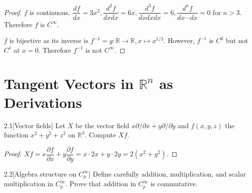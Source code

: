 \begin{proof}
    \( f \) is continuous, \( \dfrac{df}{dx} = 3x^{2}, \dfrac{d^{2}f}{dxdx} = 6x, \dfrac{d^{3}f}{dxdxdx} = 6, \dfrac{d^{n}f}{dx\cdots dx} = 0 \) for \( n > 3 \). Therefore \( f \) is \( C^{\infty} \).

    \( f \) is bijective as its inverse is \( f^{-1} = g: \mathbb{R} \to \mathbb{R}, x \mapsto x^{1/3} \). However, \( f^{-1} \) is \( C^{0} \) but not \( C^{1} \) at \( x = 0 \). Therefore \( f^{-1} \) is not \( C^{\infty} \).
\end{proof}

\section{Tangent Vectors in \( \mathbb{R}^{n} \) as Derivations}

\begin{problem}{2.1}[Vector fields]
Let \( X \) be the vector field \( x \partial/\partial x + y\partial/\partial y \) and \( f(x, y, z) \) the function \( x^{2} + y^{2} + z^{2} \) on \( \mathbb{R}^{3} \). Compute \( Xf \).
\end{problem}

\begin{proof}
    \( Xf = x\dfrac{\partial f}{\partial x} + y\dfrac{\partial f}{\partial y} = x\cdot 2x + y\cdot 2y = 2(x^{2} + y^{2}) \).
\end{proof}

\begin{problem}{2.2}[Algebra structure on \( C^{\infty}_{p} \)]
Define carefully addition, multiplication, and scalar multiplication in \( C^{\infty}_{p} \). Prove that addition in \( C^{\infty}_{p} \) is commutative.
\end{problem}

